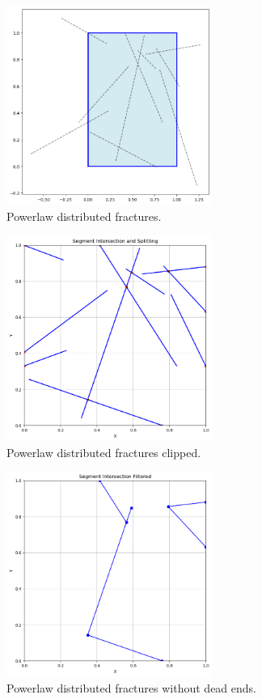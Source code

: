 \documentclass{article}
\begin{document}
\begin{figure}[htbp]
    \centering
    \includegraphics[width=0.6\textwidth]{images/Frac1.png}
    \caption{Powerlaw distributed fractures.}
    \label{fig:PowerawFrac}
\end{figure}
\begin{figure}[htbp]
    \centering
    \includegraphics[width=0.6\textwidth]{images/Frac2.png}
    \caption{Powerlaw distributed fractures clipped.}
    \label{fig:PowerawFracClipped}
\end{figure}
\begin{figure}[htbp]
    \centering
    \includegraphics[width=0.6\textwidth]{images/Frac3.png}
    \caption{Powerlaw distributed fractures without dead ends.}
    \label{fig:PowerawFracNoDeadEnds}
\end{figure}
\end{document}
